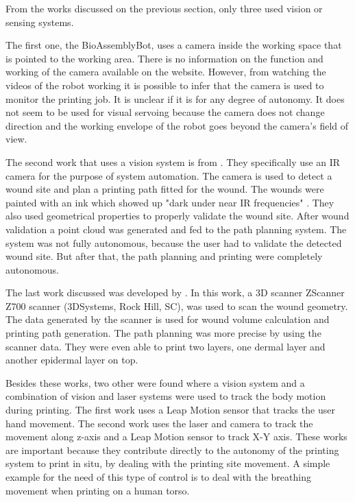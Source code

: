 From the works discussed on the previous section, only three used vision or sensing systems.

The first one, the BioAssemblyBot\textregistered, uses a camera inside the working space that is pointed to the working area. There is no information on the function and working of the camera available on the website. However, from watching the videos of the robot working it is possible to infer that the camera is used to monitor the printing job. It is unclear if it is for any degree of autonomy. It does not seem to be used for visual servoing because the camera does not change direction and the working envelope of the robot goes beyond the camera's field of view.

The second work that uses a vision system is from \citeauthor{Jafari2018_robot_system_automated_wound_filling}\cite{Jafari2018_robot_system_automated_wound_filling}. They specifically use an IR camera for the purpose of system automation. The camera is used to detect a wound site and plan a printing path fitted for the wound. The wounds were painted with an ink which showed up "dark under near IR frequencies" \cite{Jafari2018_robot_system_automated_wound_filling}. They also used geometrical properties to properly validate the wound site. After wound validation a point cloud was generated and fed to the path planning system. The system was not fully autonomous, because the user had to validate the detected wound site. But after that, the path planning and printing were completely autonomous.

The last work discussed was developed by \citeauthor{Albanna2019_in_situ_bioprinting_mobile_gantry}\cite{Albanna2019_in_situ_bioprinting_mobile_gantry}. In this work, a 3D scanner ZScanner{\texttrademark} Z700 scanner (3DSystems, Rock Hill, SC), was used to scan the wound geometry. The data generated by the scanner is used for wound volume calculation and printing path generation. The path planning was more precise by using the scanner data. They were even able to print two layers, one dermal layer and another epidermal layer on top.

Besides these works, two other were found where a vision system \cite{French2018_free_moving_human_anatomy_via_temporal_coarse_fine_control} and a combination of vision and laser \cite{ONeill2017_3d_bioprinting_directly_onto_moving_human_anatomy} systems were used to track the body motion during printing. The first work uses a Leap Motion sensor that tracks the user hand movement. The second work uses the laser and camera to track the movement along z-axis and a Leap Motion sensor to track X-Y axis. These works are important because they contribute directly to the autonomy of the printing system to print in situ, by dealing with the printing site movement. A simple example for the need of this type of control is to deal with the breathing movement when printing on a human torso.\bigskip

